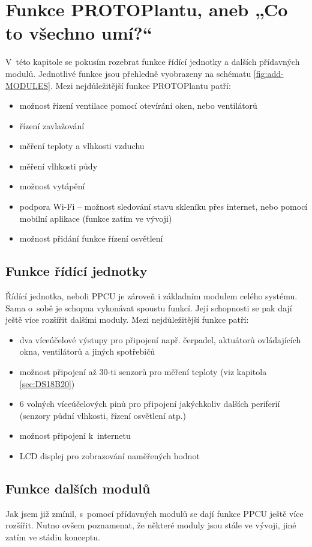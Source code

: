 \chapter{Funkce PROTOPlantu, aneb „Co to všechno umí?“}
V~této kapitole se pokusím rozebrat funkce řídící jednotky a dalších přídavných modulů.
Jednotlivé funkce jsou přehledně vyobrazeny na schématu \ref{fig:add-MODULES}.
Mezi nejdůležitější funkce PROTOPlantu patří:
\begin{itemize}
    \item možnost řízení ventilace pomocí otevírání oken, nebo ventilátorů
    \item řízení zavlažování
    \item měření teploty a vlhkosti vzduchu
    \item měření vlhkosti půdy
    \item možnost vytápění
    \item podpora Wi-Fi -- možnost sledování stavu skleníku přes internet, nebo pomocí mobilní aplikace (funkce zatím ve vývoji)
    \item možnost přidání funkce řízení osvětlení
\end{itemize}

\section{Funkce řídící jednotky}
Řídící jednotka, neboli PPCU je zároveň i základním modulem celého systému.
Sama o~sobě je schopna vykonávat spoustu funkcí.
Její schopnosti se pak dají ještě více rozšířit dalšími moduly.
Mezi nejdůležitější funkce patří:
\begin{itemize}
    \item dva víceúčelové výstupy pro připojení např. čerpadel, aktuátorů ovláda\-jí\-cích okna, ventilátorů a jiných spotřebičů
    \item možnost připojení až 30-ti senzorů pro měření teploty (viz kapitola \ref{sec:DS18B20})
    \item 6 volných víceúčelových pinů pro připojení jakýchkoliv dalších periferií (senzory půdní vlhkosti, řízení osvětlení atp.)
    \item možnost připojení k~internetu
    \item LCD displej pro zobrazování naměřených hodnot
\end{itemize}

\section{Funkce dalších modulů}
Jak jsem již zmínil, s~pomocí přídavných modulů se dají funkce PPCU ještě více rozšířit.
Nutno ovšem poznamenat, že některé moduly jsou stále ve vývoji, jiné zatím ve stádiu konceptu.
\newline

